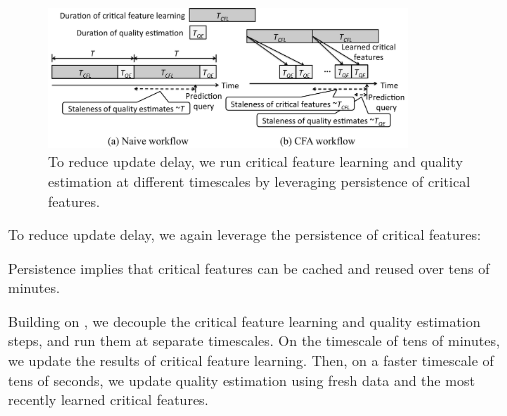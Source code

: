 \begin{figure}[t!]
\centering
\includegraphics[width=0.85\textwidth]{figures/cfa-scalability-naive-cfa.pdf}
\caption{To reduce update delay, we run critical feature learning 
and quality estimation at different timescales by leveraging 
persistence of critical features.}
\label{fig:scalable-workflow}
\end{figure}

To reduce update delay, we again leverage the 
persistence of critical features:

\begin{imp}
\vspace{0.1cm}
Persistence implies that critical features can be cached and reused
 over tens of minutes.
 \vspace{-0.3cm}
\label{imp:reducing}
\end{imp}


 Building on , we decouple the 
critical feature learning and quality estimation steps, and run
them at separate timescales.
On the timescale of tens of minutes, we update the results of 
critical feature learning. Then, on a faster timescale of tens of seconds, 
we update quality estimation using fresh data and the most recently
learned critical features. 

